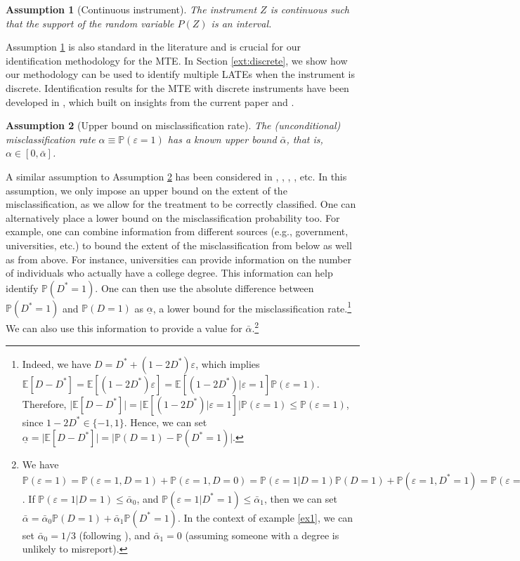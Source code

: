 \documentclass[11pt,reqno]{amsart}
\theoremstyle{plain}
\newtheorem{assumption}{Assumption}
\numberwithin{equation}{section}
\begin{document}
\begin{assumption}[Continuous instrument]\label{Cont_inst}
The instrument $Z$ is continuous such that the support of the random variable $P(Z)$ is an interval.%
\end{assumption}
Assumption \ref{Cont_inst} is also standard in the literature and is crucial for our identification methodology for the MTE.  In Section \ref{ext:discrete}, we show how our methodology can be used to identify multiple LATEs when the instrument is discrete. Identification results for the MTE with discrete instruments have been developed in \cite{Acerenza2021}, which built on insights from the current paper and \cite{Mogstadal2018}.

\begin{assumption}[Upper bound on misclassification rate]\label{Bound:mis}
The (unconditional) misclassification rate $\alpha \equiv \mathbb P(\varepsilon=1)$ has a known upper bound $\bar{\alpha}$, that is, $\alpha \in [0,\bar{\alpha}]$. 
\end{assumption}
A similar assumption to Assumption \ref{Bound:mis} has been considered in \cite{Horowitz1995}, \cite{Kreideral2007}, \cite{Molinari2008}, \cite{Kreideral2012}, etc. In this assumption, we only impose an upper bound on the extent of the misclassification, as we allow for the treatment to be correctly classified. One can alternatively place a lower bound on the misclassification probability too. For example, one can combine information from different sources (e.g., government, universities, etc.) to bound the extent of the misclassification from below as well as from above. For instance, universities can provide information on the number of individuals who actually have a college degree. This information can help identify $\mathbb P(D^*=1)$. One can then use the absolute difference between $\mathbb P(D^*=1)$ and $\mathbb P(D=1)$ as $\underline{\alpha}$, a lower bound for the misclassification rate.\footnote{Indeed, we have $D=D^*+(1-2D^*)\varepsilon$, which implies $\mathbb E[D-D^*]=\mathbb E[(1-2D^*)\varepsilon]=\mathbb E[(1-2D^*)\vert \varepsilon=1]\mathbb P(\varepsilon=1)$. Therefore, $\vert \mathbb E[D-D^*] \vert= \vert \mathbb E[(1-2D^*) \vert \varepsilon=1]\vert \mathbb P(\varepsilon=1)\leq \mathbb P(\varepsilon=1)$, since $1-2D^* \in \{-1,1\}$. Hence, we can set $\underline{\alpha}=\vert \mathbb E[D-D^*] \vert=\vert \mathbb P(D=1)-\mathbb P(D^*=1)\vert$.} We can also use this information to provide a value for $\bar{\alpha}$.\footnote{We have $\mathbb P(\varepsilon=1)=\mathbb P(\varepsilon=1,D=1)+\mathbb P(\varepsilon=1,D=0)=\mathbb P(\varepsilon=1\vert D=1)\mathbb P(D=1)+\mathbb P(\varepsilon=1,D^*=1)=\mathbb P(\varepsilon=1\vert D=1)\mathbb P(D=1)+\mathbb P(\varepsilon=1\vert D^*=1)\mathbb P(D^*=1)$. If $\mathbb P(\varepsilon=1\vert D=1) \leq \bar{\alpha}_0$, and $\mathbb P(\varepsilon=1\vert D^*=1) \leq \bar{\alpha}_1$, then we can set $\bar{\alpha}=\bar{\alpha}_0\mathbb P(D=1)+\bar{\alpha}_1\mathbb P(D^*=1)$. In the context of example \ref{ex1}, we can set $\bar{\alpha}_0=1/3$ (following \cite{Black_etal2003}), and $\bar{\alpha}_1=0$ (assuming someone with a degree is unlikely to misreport).}
\end{document}

